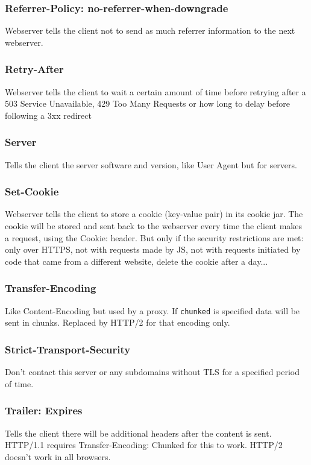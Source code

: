 \documentclass[../CMPUT-404-Notes.tex]{subfiles}
\begin{document}
\subsubsection{Referrer-Policy: no-referrer-when-downgrade}
Webserver tells the client not to send as much referrer information to the next webserver.

\subsubsection{Retry-After}
Webserver tells the client to wait a certain amount of time before retrying after a 503 Service Unavailable, 429 Too Many Requests or how long to delay before following a 3xx redirect

\subsubsection{Server}
Tells the client the server software and version, like User Agent but for servers.

\subsubsection{Set-Cookie}
Webserver tells the client to store a cookie (key-value pair) in its cookie jar.
The cookie will be stored and sent back to the webserver every time the client makes a request, using the Cookie: header.
But only if the security restrictions are met: only over HTTPS, not with requests made by JS, not with requests initiated by code that came from a different website, delete the cookie after a day...

\subsubsection{Transfer-Encoding}
Like Content-Encoding but used by a proxy. 
If \texttt{chunked} is specified data will be sent in chunks. Replaced by HTTP/2 for that encoding only. 

\subsubsection{Strict-Transport-Security}
Don't contact this server or any subdomains without TLS for a specified period of time.

\subsubsection{Trailer: Expires}
Tells the client there will be additional headers after the content is sent.
HTTP/1.1 requires Transfer-Encoding: Chunked for this to work.
HTTP/2 doesn't work in all browsers.
\end{document}
